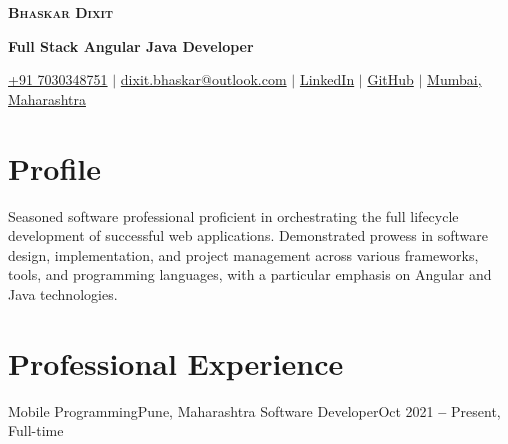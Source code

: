 \documentclass{resume}
\begin{document}

\begin{center}
    \textbf{\Huge \scshape Bhaskar Dixit} \\
    \vspace{-9pt}
    \begin{center} \textbf{ Full Stack Angular Java Developer}\end{center}
     \vspace{-9pt}

    \small
    \faMobile \hspace{.5pt} \href{tel:917030348751}{+91 7030348751}
    $|$
    \faAt \hspace{.5pt} \href{mailto:dixit.bhaskar@outlook.com}{dixit.bhaskar@outlook.com}
    $|$
    \faLinkedinSquare \hspace{.5pt} \href{https://www.linkedin.com/in/bhaskar-dixit}{LinkedIn}
    $|$
    \faGithub \hspace{.5pt} \href{https://github.com/devBhaskar98}{GitHub}
    $|$
    \faMapMarker \hspace{.5pt} \href{https://maps.app.goo.gl/cxQaZHjSpMqCGx5s9}{Mumbai, Maharashtra}
\end{center}

\section{Profile}
{ Seasoned software professional proficient in orchestrating the full lifecycle development of successful web applications. Demonstrated prowess in software design, implementation, and project management across various frameworks, tools, and programming languages, with a particular emphasis on Angular and Java technologies. }

\section{Professional Experience}
\vspace{3pt}

\resumeSubHeadingListStart
\resumeSubheading
      {Mobile Programming}{Pune, Maharashtra}
      {Software Developer}{Oct 2021 \textbf{--} Present, Full-time}
\end{document}

